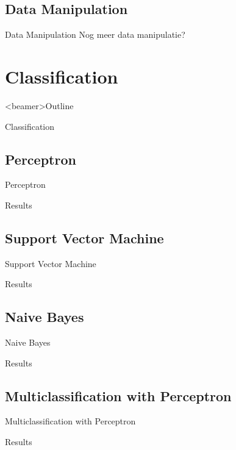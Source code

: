 \documentclass{beamer}
\begin{document}
\subsection{Data Manipulation}
\begin{frame}{Data Manipulation}
Nog meer data manipulatie?
\end{frame}

\section{Classification}
\begin{frame}<beamer>{Outline}
    \setcounter{tocdepth}{2}
    \tableofcontents[
    currentsubsection, 
    hideothersubsections, 
    sectionstyle=show/hide] 
  \end{frame}
\begin{frame}{Classification}
\end{frame}

\subsection{Perceptron}
\begin{frame}{Perceptron}
\end{frame}
\begin{frame}{Results}
\end{frame}

\subsection{Support Vector Machine}
\begin{frame}{Support Vector Machine}
\end{frame}
\begin{frame}{Results}
\end{frame}

\subsection{Naive Bayes}
\begin{frame}{Naive Bayes}
\end{frame}
\begin{frame}{Results}
\end{frame}

\subsection{Multiclassification with Perceptron}
\begin{frame}{Multiclassification with Perceptron}
\end{frame}
\begin{frame}{Results}
\end{frame}
\end{document}
